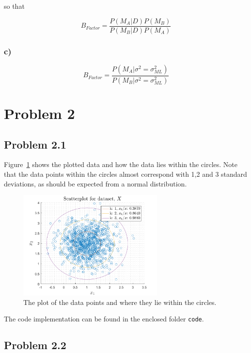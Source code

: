 \documentclass{article}
\begin{document}
so that

\begin{equation}
B_{Factor} = \frac{P(M_A|D)P(M_B) }{P(M_B|D)P(M_A)}
\end{equation}



\subsubsection*{c)}

\begin{equation}
B_{Factor}=\frac{P(M_A|\sigma^2=\sigma_{ML}^2)}{P(M_B|\sigma^2=\sigma_{ML}^2)}
\end{equation}

\newpage 

\section*{Problem 2}
\subsection*{Problem 2.1}
Figure~\ref{fig:prob21} shows the plotted data and how the data lies within the circles. Note that the data points within the circles almost correspond with 1,2 and 3 standard deviations, as should be expected from a normal distribution. 
\begin{figure}[H]
	\centering
	\includegraphics[width=0.65\textwidth]{Figures/plot2_1_scatter.png}
	\caption{The plot of the data points and where they lie within the circles.\label{fig:prob21}}
\end{figure}
The code implementation can be found in the enclosed folder \verb|code|.

\subsection*{Problem 2.2}

\end{document}
